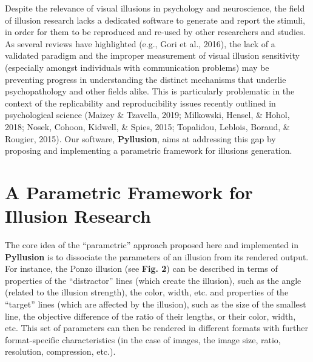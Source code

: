 \documentclass[
  english,
  man,floatsintext]{apa6}
\begin{document}
Despite the relevance of visual illusions in psychology and neuroscience, the field of illusion research lacks a dedicated software to generate and report the stimuli, in order for them to be reproduced and re-used by other researchers and studies. As several reviews have highlighted (e.g., Gori et al., 2016), the lack of a validated paradigm and the improper measurement of visual illusion sensitivity (especially amongst individuals with communication problems) may be preventing progress in understanding the distinct mechanisms that underlie psychopathology and other fields alike. This is particularly problematic in the context of the replicability and reproducibility issues recently outlined in psychological science (Maizey \& Tzavella, 2019; Milkowski, Hensel, \& Hohol, 2018; Nosek, Cohoon, Kidwell, \& Spies, 2015; Topalidou, Leblois, Boraud, \& Rougier, 2015). Our software, \textbf{Pyllusion}, aims at addressing this gap by proposing and implementing a parametric framework for illusions generation.

\hypertarget{a-parametric-framework-for-illusion-research}{%
\section{A Parametric Framework for Illusion Research}\label{a-parametric-framework-for-illusion-research}}

The core idea of the ``parametric'' approach proposed here and implemented in \textbf{Pyllusion} is to dissociate the parameters of an illusion from its rendered output. For instance, the Ponzo illusion (see \textbf{Fig. 2}) can be described in terms of properties of the ``distractor'' lines (which create the illusion), such as the angle (related to the illusion strength), the color, width, etc. and properties of the ``target'' lines (which are affected by the illusion), such as the size of the smallest line, the objective difference of the ratio of their lengths, or their color, width, etc. This set of parameters can then be rendered in different formats with further format-specific characteristics (in the case of images, the image size, ratio, resolution, compression, etc.).
\end{document}
